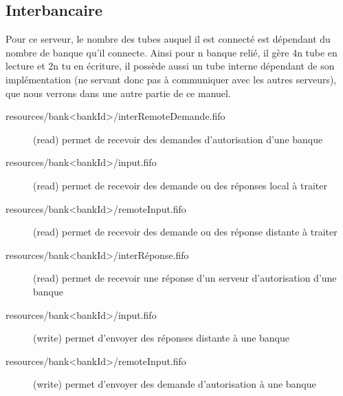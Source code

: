 \documentclass[french, a4paper, 12pt, titlepage]{article}
\begin{document}
\subsection{Interbancaire}
Pour ce serveur, le nombre des tubes auquel il est connecté est dépendant du nombre de banque qu'il connecte.
Ainsi pour n banque relié, il gère 4n tube en lecture et 2n tu en écriture, il possède aussi un tube interne dépendant de son implémentation (ne servant donc pas à communiquer avec les autres serveurs), que nous verrons dans une autre partie de ce manuel.

\begin{description}
	\item[resources/bank<bankId>/interRemoteDemande.fifo] (read) permet de recevoir des demandes d'autorisation d'une banque
	\item[resources/bank<bankId>/input.fifo] (read) permet de recevoir des demande ou des réponses local à traiter
	\item[resources/bank<bankId>/remoteInput.fifo] (read) permet de recevoir des demande ou des réponse distante à traiter
	\item[resources/bank<bankId>/interRéponse.fifo] (read) permet de recevoir une réponse d'un serveur d'autorisation d'une banque
	\item[resources/bank<bankId>/input.fifo] (write) permet d'envoyer des réponses distante à une banque
	\item[resources/bank<bankId>/remoteInput.fifo] (write) permet d'envoyer des demande d'autorisation à une banque
\end{description}
\end{document}
